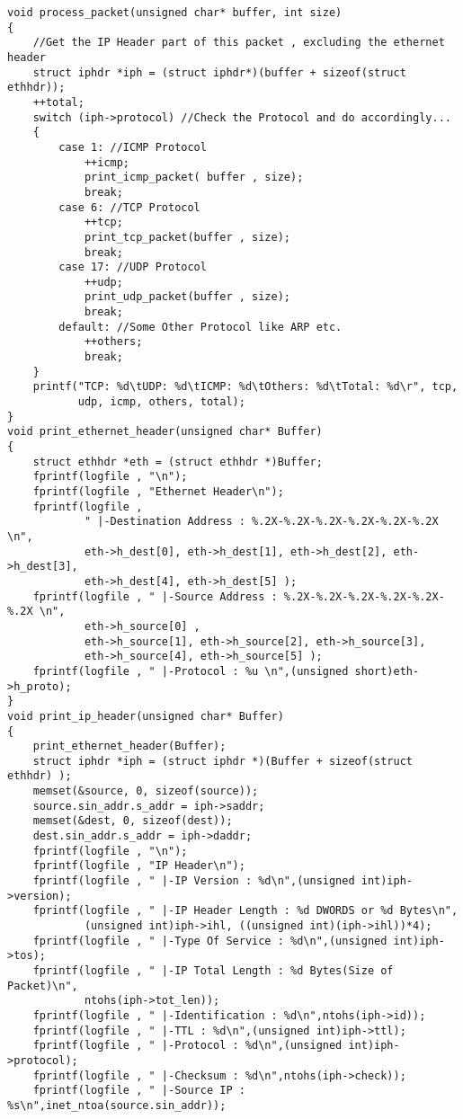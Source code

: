 \begin{verbatim}
void process_packet(unsigned char* buffer, int size)
{
    //Get the IP Header part of this packet , excluding the ethernet header
    struct iphdr *iph = (struct iphdr*)(buffer + sizeof(struct ethhdr));
    ++total;
    switch (iph->protocol) //Check the Protocol and do accordingly...
    {
        case 1: //ICMP Protocol
            ++icmp;
            print_icmp_packet( buffer , size);
            break;
        case 6: //TCP Protocol
            ++tcp;
            print_tcp_packet(buffer , size);
            break;
        case 17: //UDP Protocol
            ++udp;
            print_udp_packet(buffer , size);
            break;
        default: //Some Other Protocol like ARP etc.
            ++others;
            break;
    }
    printf("TCP: %d\tUDP: %d\tICMP: %d\tOthers: %d\tTotal: %d\r", tcp,
           udp, icmp, others, total);
}
void print_ethernet_header(unsigned char* Buffer)
{
    struct ethhdr *eth = (struct ethhdr *)Buffer;
    fprintf(logfile , "\n");
    fprintf(logfile , "Ethernet Header\n");
    fprintf(logfile , 
            " |-Destination Address : %.2X-%.2X-%.2X-%.2X-%.2X-%.2X \n",
            eth->h_dest[0], eth->h_dest[1], eth->h_dest[2], eth->h_dest[3],
            eth->h_dest[4], eth->h_dest[5] );
    fprintf(logfile , " |-Source Address : %.2X-%.2X-%.2X-%.2X-%.2X-%.2X \n",
            eth->h_source[0] ,
            eth->h_source[1], eth->h_source[2], eth->h_source[3], 
            eth->h_source[4], eth->h_source[5] );
    fprintf(logfile , " |-Protocol : %u \n",(unsigned short)eth->h_proto);
}
void print_ip_header(unsigned char* Buffer)
{
    print_ethernet_header(Buffer);
    struct iphdr *iph = (struct iphdr *)(Buffer + sizeof(struct ethhdr) );
    memset(&source, 0, sizeof(source));
    source.sin_addr.s_addr = iph->saddr;
    memset(&dest, 0, sizeof(dest));
    dest.sin_addr.s_addr = iph->daddr;
    fprintf(logfile , "\n");
    fprintf(logfile , "IP Header\n");
    fprintf(logfile , " |-IP Version : %d\n",(unsigned int)iph->version);
    fprintf(logfile , " |-IP Header Length : %d DWORDS or %d Bytes\n",
            (unsigned int)iph->ihl, ((unsigned int)(iph->ihl))*4);
    fprintf(logfile , " |-Type Of Service : %d\n",(unsigned int)iph->tos);
    fprintf(logfile , " |-IP Total Length : %d Bytes(Size of Packet)\n",
            ntohs(iph->tot_len));
    fprintf(logfile , " |-Identification : %d\n",ntohs(iph->id));
    fprintf(logfile , " |-TTL : %d\n",(unsigned int)iph->ttl);
    fprintf(logfile , " |-Protocol : %d\n",(unsigned int)iph->protocol);
    fprintf(logfile , " |-Checksum : %d\n",ntohs(iph->check));
    fprintf(logfile , " |-Source IP : %s\n",inet_ntoa(source.sin_addr));

\end{verbatim}
